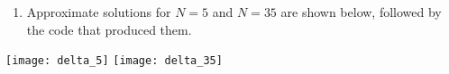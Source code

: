{\begin{solution}
\begin{enumerate}

\item Approximate solutions for $N=5$ and $N=35$ are shown below,
followed by the code that produced them.
\end{enumerate}

\begin{center}
\texttt{[image: delta\_5]}\quad
\texttt{[image: delta\_35]}
\end{center}


\end{solution}}{}

